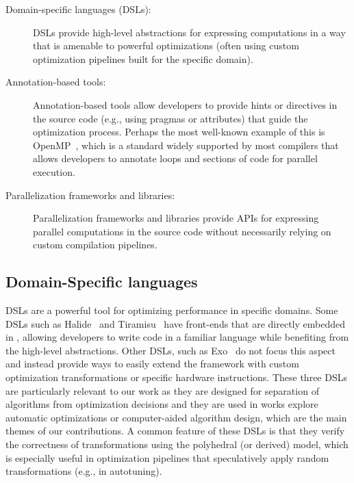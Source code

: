 \begin{description}
  \item[Domain-specific languages (DSLs):]\label{des:dsl} DSLs provide high-level abstractions for expressing computations in a way that is amenable to powerful optimizations (often using custom optimization pipelines built for the specific domain).
  \item[Annotation-based tools:]\label{des:annotation-based-tools} Annotation-based tools allow developers to provide hints or directives in the source code (e.g., using pragmas or attributes) that guide the optimization process. Perhaps the most well-known example of this is OpenMP~\cite{dagum1998openmp}, which is a standard widely supported by most compilers that allows developers to annotate loops and sections of code for parallel execution.
  \item[Parallelization frameworks and libraries:]\label{des:parallelization-frameworks} Parallelization frameworks and libraries provide APIs for expressing parallel computations in the source code without necessarily relying on custom compilation pipelines.
\end{description}


\subsection{Domain-Specific languages}\label{sec:dsls}

DSLs are a powerful tool for optimizing performance in specific domains. Some DSLs such as Halide~\cite{ragan2013halide} and Tiramisu~\cite{baghdadi2019tiramisu} have front-ends that are directly embedded in \cpp, allowing developers to write code in a familiar language while benefiting from the high-level abstractions. Other DSLs, such as Exo~\cite{ikarashi2022exocompilation} do not focus this aspect and instead provide ways to easily extend the framework with custom optimization transformations or specific hardware instructions. These three DSLs are particularly relevant to our work as they are designed for separation of algorithms from optimization decisions and they are used in works explore automatic optimizations or computer-aided algorithm design, which are the main themes of our contributions. A common feature of these DSLs is that they verify the correctness of transformations using the polyhedral (or derived) model, which is especially useful in optimization pipelines that speculatively apply random transformations (e.g., in autotuning).

